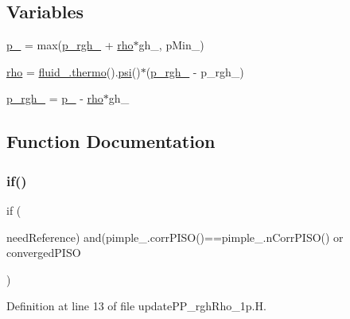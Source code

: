 \subsection*{Variables}
\begin{DoxyCompactItemize}
\item 
\hyperlink{updatePP__rghRho__1p_8H_a0ab83dbbf86dba470a7696e1609d523c}{p\+\_\+} = max(\hyperlink{updatePP__rghRho__2p_8H_a320090d1a3c1675778a59e981765c77c}{p\+\_\+rgh\+\_\+} + \hyperlink{EEqn__1pl_8H_ac955f87ac2b79f02f420cae087fc52b1}{rho}$\ast$gh\+\_\+, p\+Min\+\_\+)
\item 
\hyperlink{updatePP__rghRho__1p_8H_ab8ec92cc3ea8422c9349409bae98d2a0}{rho} = \hyperlink{EEqns__2p_8H_a9d615e711281a88a96c648787c7dbd32}{fluid\+\_\+.\+thermo}().\hyperlink{UEqn__1pl_8H_a165a34deec3ee505598e511a88831968}{psi}()$\ast$(\hyperlink{updatePP__rghRho__2p_8H_a320090d1a3c1675778a59e981765c77c}{p\+\_\+rgh\+\_\+} -\/ p\+\_\+rgh\+\_)
\item 
\hyperlink{updatePP__rghRho__1p_8H_a320090d1a3c1675778a59e981765c77c}{p\+\_\+rgh\+\_\+} = \hyperlink{updatePP__rghRho__2p_8H_a0ab83dbbf86dba470a7696e1609d523c}{p\+\_\+} -\/ \hyperlink{EEqn__1pl_8H_ac955f87ac2b79f02f420cae087fc52b1}{rho}$\ast$gh\+\_\+
\end{DoxyCompactItemize}


\subsection{Function Documentation}
\mbox{\label{updatePP__rghRho__1p_8H_a6b0b445e2474f6c91dff129b26b6c6db}} 
\subsubsection{\texorpdfstring{if()}{if()}}
{\footnotesize\ttfamily if (\begin{DoxyParamCaption}\item[{p\+\_\+rgh\+\_\+.}]{need\+Reference) and(pimple\+\_\+.\+corr\+P\+I\+S\+O()==pimple\+\_\+.\+n\+Corr\+P\+I\+S\+O() or converged\+P\+I\+SO }\end{DoxyParamCaption})}



Definition at line 13 of file update\+P\+P\+\_\+rgh\+Rho\+\_\+1p.\+H.



